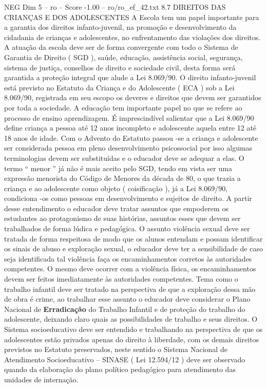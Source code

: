 \begin{textsample}{NEG Dim 5 – ro – Score -1.00 – ro/ro\_ef\_42.txt}  \label{ex:f5_neg_175}
8.7 DIREITOS DAS CRIANÇAS E DOS ADOLESCENTES A Escola tem um papel importante para a garantia dos direitos infanto-juvenil, na promoção e desenvolvimento da cidadania de crianças e adolescentes, no enfrentamento das violações dos direitos.
A atuação da escola deve ser de forma convergente com todo o Sistema de Garantia de Direito ( SGD ), saúde, educação, assistência social, segurança, sistema de justiça, conselhos de direito e sociedade civil, desta forma será garantida a proteção integral que alude a Lei 8.069/90.
O direito infanto-juvenil está previsto no Estatuto da Criança e do Adolescente ( ECA ) sob a Lei 8.069/90, registrada em seu escopo os deveres e direitos que devem ser garantidos por toda a sociedade.
A educação tem importante papel no que se refere ao processo de ensino aprendizagem.
É imprescindível salientar que a Lei 8.069/90 define criança a pessoa até 12 anos incompleto e adolescente aquela entre 12 até 18 anos de idade.
Com o Advento do Estatuto passou -se a criança e adolescente ser considerada pessoa em pleno desenvolvimento psicossocial por isso algumas terminologias devem ser substituídas e o educador deve se adequar a elas.
O termo “ menor ” já não é mais aceito pelo SGD, tendo em vista ser uma expressão menorista do Código de Menores da década de 80, o que trazia a criança e ao adolescente como objeto ( coisificação ), já a Lei 8.069/90, condiciona -os como pessoas em desenvolvimento e sujeitos de direito.
A partir desse entendimento o educador deve tratar assuntos que empoderem os estudantes ao protagonismo de suas histórias, assuntos esses que devem ser trabalhados de forma lúdica e pedagógica.
O assunto violência sexual deve ser tratada de forma respeitosa de modo que os alunos entendam e possam identificar os sinais de abuso e exploração sexual, o educador deve ter a sensibilidade de caso seja identificada tal violência faça os encaminhamentos corretos às autoridades competentes.
O mesmo deve ocorrer com a violência física, os encaminhamentos devem ser feitos imediatamente às autoridades competentes.
Tema como o trabalho infantil deve ser tratado na perspectiva de que a exploração dessa mão de obra é crime, ao trabalhar esse assunto o educador deve considerar o Plano Nacional de \textbf{Erradicação} do Trabalho Infantil e de proteção do trabalho do adolescente, deixando claro quais as possibilidades de trabalho e seus direitos.
O Sistema socioeducativo deve ser entendido e trabalhando na perspectiva de que os adolescentes estão privados apenas do direito à liberdade, com os demais direitos previstos no Estatuto preservados, neste sentido o Sistema Nacional de Atendimento Socioeducativo – SINASE ( Lei 12.594/12 ) deve ser observado quando da elaboração do plano político pedagógico para atendimento das unidades de internação.

\end{textsample}
